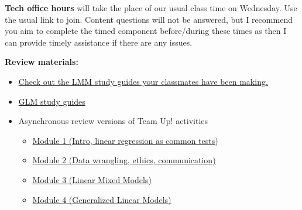 \documentclass[
  openany]{book}
\begin{document}
\textbf{Tech office hours} will take the place of our usual class time on Wednesday. Use the usual link to join. Content questions will not be answered, but I recommend you aim to complete the timed component before/during these times as then I can provide timely assistance if there are any issues.

\textbf{Review materials:}

\begin{itemize}
\item
  \href{https://q.utoronto.ca/courses/253305/discussion_topics/1637653}{Check out the LMM study guides your classmates have been making.}
\item
  \href{https://q.utoronto.ca/courses/253305/discussion_topics/1637656}{GLM study guides}
\item
  Asynchronous review versions of Team Up! activities

  \begin{itemize}
  \item
    \href{https://jupyter.utoronto.ca/hub/user-redirect/git-pull?repo=https\%3A\%2F\%2Fgithub.com\%2Fsta303-bolton\%2Fsta303-w22-activities\&urlpath=shiny\%2Fsta303-w22-activities\%2Finst\%2Ftutorials\%2Fsta303_m1_teamup_asynch\%2FSTA303_m1_teamup_synch.Rmd\&branch=master}{Module 1 (Intro, linear regression as common tests)}
  \item
    \href{https://jupyter.utoronto.ca/user/4d5187e2-ccd2-4902-8663-8a8c9843584a/git-pull?repo=https\%3A\%2F\%2Fgithub.com\%2Fsta303-bolton\%2Fsta303-w22-activities\&urlpath=shiny\%2Fsta303-w22-activities\%2Finst\%2Ftutorials\%2Fsta303_m2_teamup_asynch\%2FSTA303_m2_teamup_asynch.Rmd\&branch=master}{Module 2 (Data wrangling, ethics, communication)}
  \item
    \href{https://jupyter.utoronto.ca/hub/user-redirect/git-pull?repo=https\%3A\%2F\%2Fgithub.com\%2Fsta303-bolton\%2Fsta303-w22-activities\&urlpath=shiny\%2Fsta303-w22-activities\%2Finst\%2Ftutorials\%2Fsta303_m3_teamup_asynch\%2FSTA303_m3_teamup_asynch.Rmd\&branch=master}{Module 3 (Linear Mixed Models)}
  \item
    \href{https://jupyter.utoronto.ca/hub/user-redirect/git-pull?repo=https\%3A\%2F\%2Fgithub.com\%2Fsta303-bolton\%2Fsta303-w22-activities\&urlpath=shiny\%2Fsta303-w22-activities\%2Finst\%2Ftutorials\%2Fsta303_m4_teamup_asynch\%2FSTA303_m4_teamup_asynch.Rmd\&branch=master}{Module 4 (Generalized Linear Models)}
  \end{itemize}
\end{itemize}
\end{document}
